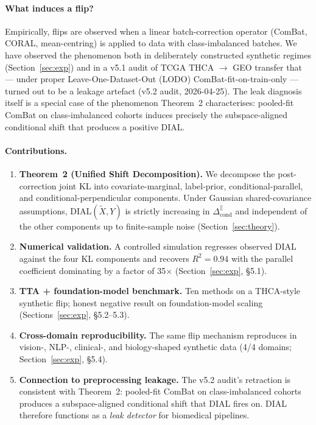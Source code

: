\documentclass{article}
\newcommand{\dial}{\mathrm{DIAL}}
\begin{document}
\paragraph{What induces a flip?}
Empirically, flips are observed when a linear batch-correction operator
(ComBat, CORAL, mean-centring) is applied to data with class-imbalanced
batches. We have observed the phenomenon both in deliberately constructed
synthetic regimes (Section~\ref{sec:exp}) and in a v5.1 audit of TCGA
THCA $\to$ GEO transfer that — under proper Leave-One-Dataset-Out (LODO)
ComBat-fit-on-train-only — turned out to be a leakage artefact (v5.2
audit, 2026-04-25). The leak diagnosis itself is a special case of the
phenomenon Theorem~2 characterises: pooled-fit ComBat on
class-imbalanced cohorts induces precisely the subspace-aligned
conditional shift that produces a positive DIAL.

\paragraph{Contributions.}
\begin{enumerate}
\item \textbf{Theorem~2 (Unified Shift Decomposition).} We decompose the
  post-correction joint KL into covariate-marginal, label-prior,
  conditional-parallel, and conditional-perpendicular components. Under
  Gaussian shared-covariance assumptions, $\dial(\tilde X,Y)$ is strictly
  increasing in $\Delta_{\text{cond}}^{\parallel}$ and independent of the
  other components up to finite-sample noise (Section~\ref{sec:theory}).
\item \textbf{Numerical validation.} A controlled simulation regresses
  observed DIAL against the four KL components and recovers
  $R^{2}=0.94$ with the parallel coefficient dominating by a factor of
  35\(\times\) (Section~\ref{sec:exp}, §5.1).
\item \textbf{TTA + foundation-model benchmark.} Ten methods on a
  THCA-style synthetic flip; honest negative result on
  foundation-model scaling (Sections~\ref{sec:exp}, §5.2--5.3).
\item \textbf{Cross-domain reproducibility.} The same flip mechanism
  reproduces in vision-, NLP-, clinical-, and biology-shaped synthetic
  data (4/4 domains; Section~\ref{sec:exp}, §5.4).
\item \textbf{Connection to preprocessing leakage.} The v5.2 audit's
  retraction is consistent with Theorem~2: pooled-fit ComBat on
  class-imbalanced cohorts produces a subspace-aligned conditional
  shift that DIAL fires on. DIAL therefore functions as a
  \emph{leak detector} for biomedical pipelines.
\end{enumerate}
\end{document}
